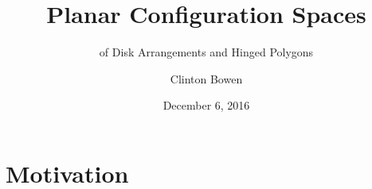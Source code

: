 \documentclass{beamer}
\title[Planar Configuration Spaces]{Planar Configuration Spaces }
\subtitle{of Disk Arrangements and Hinged Polygons}
\author{Clinton Bowen}
\institute
{
  Cal State Northridge
}
\date
{December 6, 2016}
\begin{document}
\frame{\titlepage}
\section{Motivation}

\end{document}
